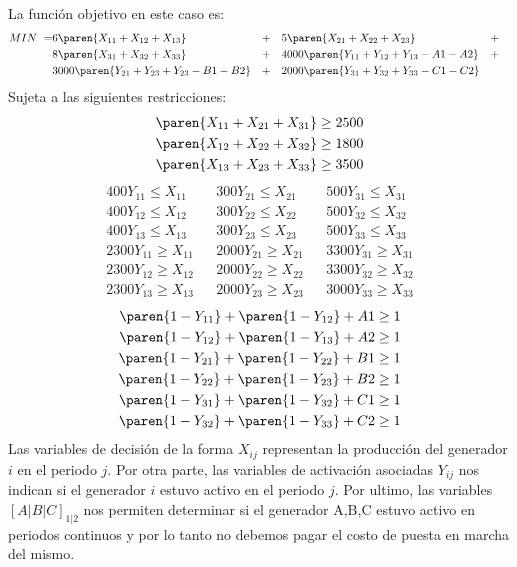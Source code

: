 

\begin{homeworkProblem}
La función objetivo en este caso es:
\begin{align*}
    MIN\ = &6\paren{X_{11} + X_{12} + X_{13}}& &+&
     &5\paren{X_{21} + X_{22} + X_{23}}& &+& \\
      &8\paren{X_{31} + X_{32} + X_{33}}& &+&
	&4000\paren{Y_{11} + Y_{12} + Y_{13} - A1 - A2}& &+& \\
    &3000\paren{Y_{21} + Y_{23} + Y_{23} - B1 - B2}& &+&
     &2000\paren{Y_{31} + Y_{32} + Y_{33} - C1 - C2}&
\end{align*}
Sujeta a las siguientes restricciones:
\begin{align*}
    \paren{X_{11} + X_{21} + X_{31}} \geq 2500\\
    \paren{X_{12} + X_{22} + X_{32}} \geq 1800\\
    \paren{X_{13} + X_{23} + X_{33}} \geq 3500
\end{align*}
\begin{align*}
    &400Y_{11} \le X_{11}& &300Y_{21} \le X_{21}& &500Y_{31} \le X_{31}& \\
    &400Y_{12} \le X_{12}& &300Y_{22} \le X_{22}& &500Y_{32} \le X_{32}& \\
    &400Y_{13} \le X_{13}& &300Y_{23} \le X_{23}& &500Y_{33} \le X_{33}& \\
    &2300Y_{11} \geq X_{11}& &2000Y_{21} \geq X_{21}& &3300Y_{31} \geq X_{31}& \\
    &2300Y_{12} \geq X_{12}& &2000Y_{22} \geq X_{22}& &3300Y_{32} \geq X_{32}& \\
    &2300Y_{13} \geq X_{13}& &2000Y_{23} \geq X_{23}& &3000Y_{33} \geq X_{33}& 
\end{align*}
\begin{align*}
    \paren{1-Y_{11}} + \paren{1-Y_{12}} + A1\geq 1\\
    \paren{1-Y_{12}} + \paren{1-Y_{13}} + A2\geq 1\\
    \paren{1-Y_{21}} + \paren{1-Y_{22}} + B1\geq 1\\
    \paren{1-Y_{22}} + \paren{1-Y_{23}} + B2\geq 1\\
    \paren{1-Y_{31}} + \paren{1-Y_{32}} + C1\geq 1\\
    \paren{1-Y_{32}} + \paren{1-Y_{33}} + C2\geq 1
\end{align*}
Las variables de decisión de la forma $X_{ij}$ representan la producción del generador $i$ en el periodo $j$. Por otra parte, las variables de activación asociadas $Y_{ij}$ nos indican si el generador $i$ estuvo activo en el periodo $j$.
Por ultimo, las variables $[A|B|C]_{1|2}$ nos permiten determinar si el generador A,B,C estuvo activo en periodos continuos y por lo tanto no debemos pagar el costo de puesta en marcha del mismo.
\end{homeworkProblem}


